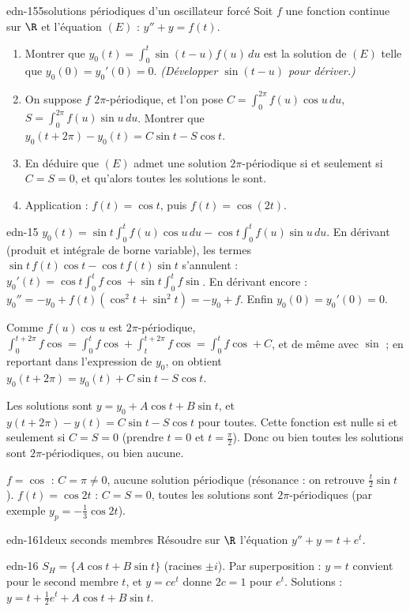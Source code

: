 \begin{exo}{edn-15}{5}{solutions périodiques d'un oscillateur forcé}
Soit $f$ une fonction continue sur $\R$ et l'équation $(E)$ : $y''+y=f(t)$.
\begin{enumerate}
\item Montrer que $y_0(t)=\displaystyle\int_0^t\sin(t-u)f(u)\,du$ est la solution de $(E)$ telle que $y_0(0)=y_0'(0)=0$.
\emph{(Développer $\sin(t-u)$ pour dériver.)}
\item On suppose $f$ $2\pi$-périodique, et l'on pose $C=\int_0^{2\pi}f(u)\cos u\,du$, $S=\int_0^{2\pi}f(u)\sin u\,du$. Montrer que
$y_0(t+2\pi)-y_0(t)=C\sin t-S\cos t$.
\item En déduire que $(E)$ admet une solution $2\pi$-périodique si et seulement si $C=S=0$, et qu'alors toutes les solutions
le sont.
\item Application : $f(t)=\cos t$, puis $f(t)=\cos(2t)$.
\end{enumerate}
\end{exo}
\begin{corrige}{edn-15}
 $y_0(t)=\sin t\int_0^tf(u)\cos u\,du-\cos t\int_0^tf(u)\sin u\,du$. En dérivant (produit et intégrale de borne variable),
les termes $\sin t\,f(t)\cos t-\cos t\,f(t)\sin t$ s'annulent : $y_0'(t)=\cos t\int_0^tf\cos+\sin t\int_0^tf\sin$. En dérivant
encore : $y_0''=-y_0+f(t)(\cos^2t+\sin^2t)=-y_0+f$. Enfin $y_0(0)=y_0'(0)=0$.

 Comme $f(u)\cos u$ est $2\pi$-périodique, $\int_0^{t+2\pi}f\cos=\int_0^tf\cos+\int_t^{t+2\pi}f\cos=\int_0^tf\cos+C$, et de même avec
$\sin$ ; en reportant dans l'expression de $y_0$, on obtient $y_0(t+2\pi)=y_0(t)+C\sin t-S\cos t$.

 Les solutions sont $y=y_0+A\cos t+B\sin t$, et $y(t+2\pi)-y(t)=C\sin t-S\cos t$ pour toutes. Cette fonction est nulle si et
seulement si $C=S=0$ (prendre $t=0$ et $t=\frac\pi2$). Donc ou bien toutes les solutions sont $2\pi$-périodiques, ou bien aucune.

 $f=\cos$ : $C=\pi\neq0$, aucune solution périodique (résonance : on retrouve $\frac t2\sin t$). $f(t)=\cos2t$ : $C=S=0$, toutes
les solutions sont $2\pi$-périodiques (par exemple $y_p=-\frac13\cos2t$).
\end{corrige}

\begin{exo}{edn-16}{1}{deux seconds membres}
Résoudre sur $\R$ l'équation $y''+y=t+e^t$.
\end{exo}
\begin{corrige}{edn-16}
$S_H=\{A\cos t+B\sin t\}$ (racines $\pm i$). Par superposition : $y=t$ convient pour le second membre $t$, et $y=ce^t$ donne
$2c=1$ pour $e^t$. Solutions : $y=t+\frac12e^t+A\cos t+B\sin t$.
\end{corrige}

